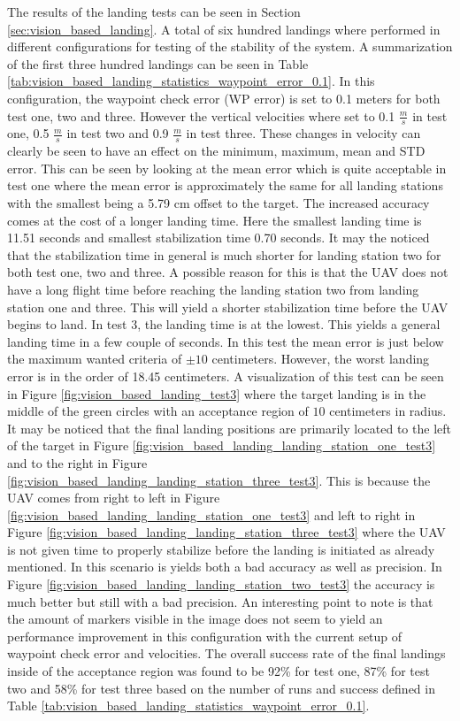 \documentclass[../Head/report.tex]{subfiles}
\begin{document}
The results of the landing tests can be seen in Section \ref{sec:vision_based_landing}. A total of six hundred landings where performed in different configurations for testing of the stability of the system. A summarization of the first three hundred landings can be seen in Table \ref{tab:vision_based_landing_statistics_waypoint_error_0.1}. In this configuration, the waypoint check error (WP error) is set to 0.1 meters for both test one, two and three. However the vertical velocities where set to 0.1 $\frac{m}{s}$ in test one, 0.5 $\frac{m}{s}$ in test two and 0.9 $\frac{m}{s}$ in test three. These changes in velocity can clearly be seen to have an effect on the minimum, maximum, mean and STD error. This can be seen by looking at the mean error which is quite acceptable in test one where the mean error is approximately the same for all landing stations with the smallest being a 5.79 cm offset to the target. The increased accuracy comes at the cost of a longer landing time. Here the smallest landing time is 11.51 seconds and smallest stabilization time 0.70 seconds. It may the noticed that the stabilization time in general is much shorter for landing station two for both test one, two and three. A possible reason for this is that the UAV does not have a long flight time before reaching the landing station two from landing station one and three. This will yield a shorter stabilization time before the UAV begins to land. In test 3, the landing time is at the lowest. This yields a general landing time in a few couple of seconds. In this test the mean error is just below the maximum wanted criteria of $\pm 10$ centimeters. However, the worst landing error is in the order of 18.45 centimeters. A visualization of this test can be seen in Figure \ref{fig:vision_based_landing_test3} where the target landing is in the middle of the green circles with an acceptance region of $10$ centimeters in radius. It may be noticed that the final landing positions are primarily located to the left of the target in Figure \ref{fig:vision_based_landing_landing_station_one_test3} and to the right in Figure \ref{fig:vision_based_landing_landing_station_three_test3}. This is because the UAV comes from right to left in Figure \ref{fig:vision_based_landing_landing_station_one_test3} and left to right in Figure \ref{fig:vision_based_landing_landing_station_three_test3} where the UAV is not given time to properly stabilize before the landing is initiated as already mentioned. In this scenario is yields both a bad accuracy as well as precision. In Figure \ref{fig:vision_based_landing_landing_station_two_test3} the accuracy is much better but still with a bad precision. An interesting point to note is that the amount of markers visible in the image does not seem to yield an performance improvement in this configuration with the current setup of waypoint check error and velocities. The overall success rate of the final landings inside of the acceptance region was found to be 92\% for test one, 87\% for test two and 58\% for test three based on the number of runs and success defined in Table \ref{tab:vision_based_landing_statistics_waypoint_error_0.1}. 
\end{document}
